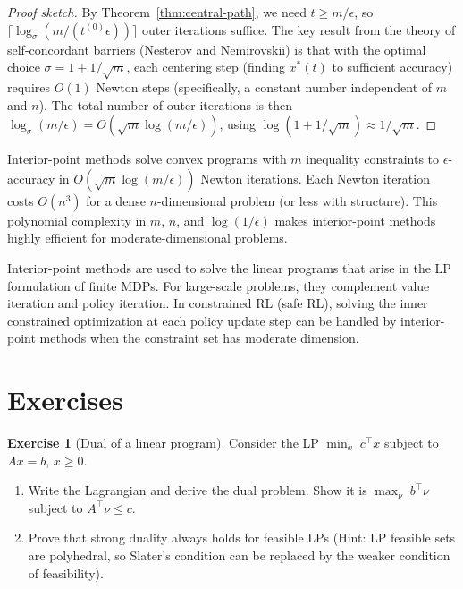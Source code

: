 \documentclass[11pt,a4paper]{article}
\theoremstyle{definition}
\newtheorem{exercise}{Exercise}[section]
\theoremstyle{plain}
\theoremstyle{remark}
\begin{document}
\begin{proof}[Proof sketch]
By Theorem~\ref{thm:central-path}, we need $t \ge m/\epsilon$, so
$\lceil \log_\sigma(m/(t^{(0)}\epsilon))\rceil$ outer iterations suffice.
The key result from the theory of self-concordant barriers (Nesterov and
Nemirovskii) is that with the optimal choice $\sigma = 1 + 1/\sqrt{m}$,
each centering step (finding $x^*(t)$ to sufficient accuracy) requires
$O(1)$ Newton steps (specifically, a constant number independent of $m$ and
$n$). The total number of outer iterations is then
$\log_\sigma(m/\epsilon) = O(\sqrt{m}\log(m/\epsilon))$,
using $\log(1 + 1/\sqrt{m}) \approx 1/\sqrt{m}$.
\end{proof}

\begin{keyresult}[title={Interior-Point Complexity}]
Interior-point methods solve convex programs with $m$ inequality constraints
to $\epsilon$-accuracy in $O(\sqrt{m}\log(m/\epsilon))$ Newton iterations.
Each Newton iteration costs $O(n^3)$ for a dense $n$-dimensional problem
(or less with structure). This polynomial complexity in $m$, $n$, and
$\log(1/\epsilon)$ makes interior-point methods highly efficient for
moderate-dimensional problems.
\end{keyresult}

\begin{rlconnection}
Interior-point methods are used to solve the linear programs that arise in the
LP formulation of finite MDPs. For large-scale problems, they complement
value iteration and policy iteration. In constrained RL (safe RL), solving
the inner constrained optimization at each policy update step can be handled
by interior-point methods when the constraint set has moderate dimension.
\end{rlconnection}

\section{Exercises}\label{sec:exercises}

\begin{exercise}[Dual of a linear program]\label{ex:lp-dual}
Consider the LP $\min_x \; c^\top x$ subject to $Ax = b$, $x \ge 0$.
\begin{enumerate}[label=(\alph*)]
  \item Write the Lagrangian and derive the dual problem. Show it is
    $\max_\nu \; b^\top \nu$ subject to $A^\top \nu \le c$.
  \item Prove that strong duality always holds for feasible LPs (Hint: LP
    feasible sets are polyhedral, so Slater's condition can be replaced by
    the weaker condition of feasibility).
\end{enumerate}
\end{exercise}
\end{document}

